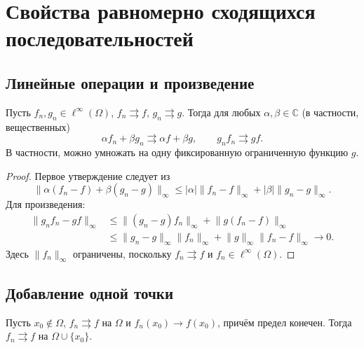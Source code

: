 \section{Свойства равномерно сходящихся последовательностей}\label{sec-sequences-02}

\subsection{Линейные операции и произведение}\label{sec-sequences-02-1}

\begin{theorem}\label{thm-sequence-operations}

Пусть \(f_n,g_n\in\ell^\infty(\Omega)\), \(f_n\rightrightarrows f\), \(g_n\rightrightarrows g\). Тогда для любых \(\alpha,\beta\in\mathbb C\) (в частности, вещественных) \[
\alpha f_n+\beta g_n\rightrightarrows\alpha f+\beta g,
\qquad g_nf_n\rightrightarrows gf.
\] В частности, можно умножать на одну фиксированную ограниченную функцию \(g\).

\end{theorem}

\begin{proof}

Первое утверждение следует из \[
\lVert \alpha(f_n-f)+\beta(g_n-g)\rVert_\infty
\le |\alpha|\lVert f_n-f\rVert_\infty+|\beta|\lVert g_n-g\rVert_\infty.
\] Для произведения: \[
\begin{aligned}
\lVert g_nf_n-gf\rVert_\infty
&\le\lVert (g_n-g)f_n\rVert_\infty+\lVert g(f_n-f)\rVert_\infty\\
&\le\lVert g_n-g\rVert_\infty\lVert f_n\rVert_\infty
+\lVert g\rVert_\infty\lVert f_n-f\rVert_\infty\longrightarrow0.
\end{aligned}
\] Здесь \(\lVert f_n\rVert_\infty\) ограничены, поскольку \(f_n\rightrightarrows f\) и \(f_n\in\ell^\infty(\Omega)\).

\end{proof}

\subsection{Добавление одной точки}\label{sec-sequences-02-2}

\begin{theorem}\label{thm-add-point}

Пусть \(x_0\notin\Omega\), \(f_n\rightrightarrows f\) на \(\Omega\) и \(f_n(x_0)\to f(x_0)\), причём предел конечен. Тогда \(f_n\rightrightarrows f\) на \(\Omega\cup\{x_0\}\).

\end{theorem}

